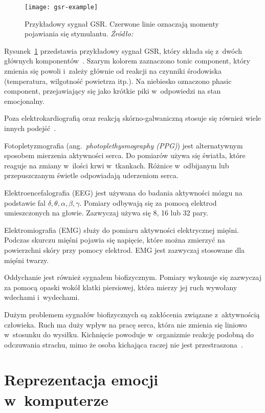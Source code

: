 \begin{figure}[h]
    \centering
    \texttt{[image: gsr-example]}
    \caption{Przykładowy sygnał GSR. Czerwone linie oznaczają momenty pojawiania się stymulantu. \textit{Źródło:~\cite{Dzedzickis2020}}}
    \label{fig:gsr-example}
\end{figure}

Rysunek~\ref{fig:gsr-example} przedstawia przykładowy sygnał GSR, który składa się z~dwóch głównych komponentów~\cite{Dzedzickis2020}.
Szarym kolorem zaznaczono tonic component, który zmienia się powoli i~zależy głównie od reakcji na czynniki środowiska (temperatura, wilgotność powietrza itp.).
Na niebiesko oznaczono phasic component, przejawiający się jako krótkie piki w~odpowiedzi na stan emocjonalny.

Poza elektrokardiografią oraz reakcją skórno-galwaniczną stosuje się również wiele innych podejść~\cite{Dzedzickis2020, Calvo2015}.

Fotopletyzmografia (ang.~\textit{photoplethysmography (PPG)}) jest alternatywnym sposobem mierzenia aktywności serca.
Do pomiarów używa się światła, które reaguje na zmiany w~ilości krwi w~tkankach.
Różnice w~odbijanym lub przepuszczanym świetle odpowiadają uderzeniom serca.

Elektroencefalografia (EEG) jest używana do badania aktywności mózgu na podstawie fal $\delta, \theta, \alpha, \beta, \gamma$.
Pomiary odbywają się za pomocą elektrod umieszczonych na głowie.
Zazwyczaj używa się 8, 16 lub 32 pary.

Elektromiografia (EMG) służy do pomiaru aktywności elektrycznej mięśni.
Podczas skurczu mięśni pojawia się napięcie, które można zmierzyć na powierzchni skóry przy pomocy elektrod.
EMG jest zazwyczaj stosowane dla mięśni twarzy.

Oddychanie jest również sygnałem biofizycznym.
Pomiary wykonuje się zazwyczaj za pomocą opaski wokół klatki piersiowej, która mierzy jej ruch wywołany wdechami i~wydechami.

Dużym problemem sygnałów biofizycznych są zakłócenia związane z~aktywnością człowieka.
Ruch ma duży wpływ na pracę serca, która nie zmienia się liniowo w~stosunku do wysiłku.
Kichnięcie powoduje w~organizmie reakcję podobną do odczuwania strachu, mimo że osoba kichająca raczej nie jest przestraszona~\cite{Calvo2015}.


\section{Reprezentacja emocji w~komputerze}\label{sec:reprezentacja-emocji-w-komputerze}

